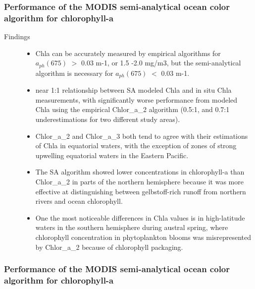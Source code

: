\begin{frame}\frametitle{Performance of the MODIS semi-analytical ocean color algorithm for chlorophyll-a} 
\scriptsize
\begin{description}
    \item[Findings]
        \begin{itemize}
            \item Chla can be accurately measured by empirical algorithms for $a_{ph}(675)$ $>$ 0.03 m-1, or 1.5 -2.0 mg/m3, but the semi-analytical algorithm is necessary for $a_{ph}(675)$ $<$ 0.03 m-1.
            \item near 1:1 relationship between SA modeled Chla and in situ Chla measurements, with significantly worse performance from modeled Chla using the empirical Chlor\_a\_2 algorithm (0.5:1, and 0.7:1 underestimations for two different study areas). 
            \item Chlor\_a\_2 and Chlor\_a\_3 both tend to agree with their estimations of Chla in equatorial waters, with the exception of zones of strong upwelling equatorial waters in the Eastern Pacific.
            \item The SA algorithm showed lower concentrations in chlorophyll-a than Chlor\_a\_2 in parts of the northern hemisphere because it was more effective at distinguishing between gelbstoff-rich runoff from northern rivers and ocean chlorophyll.
            \item One the most noticeable differences in Chla values is in high-latitude waters in the southern hemisphere during austral spring, where chlorophyll concentration in phytoplankton blooms was misrepresented by Chlor\_a\_2 because of chlorophyll packaging. 
        \end{itemize}
\end{description}

\end{frame}

\begin{frame}\frametitle{Performance of the MODIS semi-analytical ocean color algorithm for chlorophyll-a} 

\end{frame}
